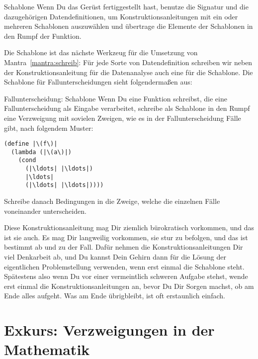 \begin{konstruktionsanleitung}{Schablone}
  Wenn Du das Gerüst fertiggestellt hast, benutze die Signatur und die
  dazugehörigen Datendefinitionen, um Konstruktionsanleitungen mit ein
  oder mehreren Schablonen auszuwählen und übertrage die Elemente der
  Schablonen in den Rumpf der Funktion.
\end{konstruktionsanleitung}
%
Die Schablone ist das nächste Werkzeug für die Umsetzung von
Mantra~\ref{mantra:schreib}:
%
\mantraschreib*
%
\noindent Für jede Sorte von Datendefinition schreiben wir neben der
Konstruktionsanleitung für die Datenanalyse auch eine für die
Schablone.  Die Schablone für Fallunterscheidungen sieht
folgendermaßen aus:
%
\begin{konstruktionsanleitung}{Fallunterscheidung: Schablone}
  \label{ka:fallunterscheidung-schablone}
  Wenn Du eine Funktion schreibst, die eine Fallunterscheidung als
  Eingabe verarbeitet, schreibe als Schablone in den Rumpf eine
  Verzweigung mit sovielen Zweigen, wie es in der Fallunterscheidung
  Fälle gibt, nach folgendem Muster:
\begin{lstlisting}
(define |\(f\)|
  (lambda (|\(a\)|)
    (cond
      (|\ldots| |\ldots|)
      |\ldots|
      (|\ldots| |\ldots|))))
\end{lstlisting}
  Schreibe danach Bedingungen in die Zweige, welche die einzelnen
  Fälle voneinander unterscheiden.
\end{konstruktionsanleitung}
%
Diese Konstruktionsanleitung mag Dir ziemlich bürokratisch vorkommen,
und das ist sie auch.  Es mag Dir langweilig vorkommen, sie stur zu
befolgen, und das ist bestimmt ab und zu der Fall.  Dafür nehmen die
Konstruktionsanleitungen Dir viel Denkarbeit ab, und Du kannst Dein
Gehirn dann für die Lösung der eigentlichen Problemstellung verwenden,
wenn erst einmal die Schablone steht.  Spätestens also wenn Du vor
einer vermeintlich schweren Aufgabe stehst, wende erst einmal die
Konstruktionsanleitungen an, bevor Du Dir Sorgen machst, ob am Ende
alles aufgeht.  Was am Ende übrigbleibt, ist oft erstaunlich einfach.

\section{Exkurs: Verzweigungen in der Mathematik}

